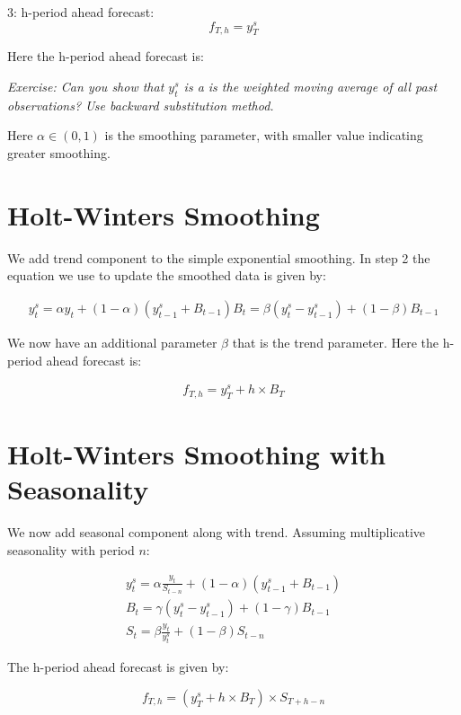 \documentclass[]{book}
\theoremstyle{definition}
\theoremstyle{definition}
\theoremstyle{definition}
\theoremstyle{remark}
\begin{document}
3: h-period ahead forecast: \[f_{T,h}= y_T^s\]

Here the h-period ahead forecast is:

\emph{Exercise: Can you show that \(y_{t}^{s}\) is a is the weighted
moving average of all past observations? Use backward substitution
method.}

Here \(\alpha \in (0,1)\) is the smoothing parameter, with smaller value
indicating greater smoothing.

\hypertarget{holt-winters-smoothing}{%
\section{Holt-Winters Smoothing}\label{holt-winters-smoothing}}

We add trend component to the simple exponential smoothing. In step 2
the equation we use to update the smoothed data is given by:

\begin{align}
    y_{t}^{s}= \alpha y_t + (1-\alpha)(y_{t-1}^{s}+B_{t-1})
    B_t = \beta (y_t^s -y_{t-1}^s) + (1-\beta) B_{t-1}
 \end{align}

We now have an additional parameter \(\beta\) that is the trend
parameter. Here the h-period ahead forecast is:

\begin{align}
  f_{T,h} = y_T^s + h\times B_T
  \end{align}

\hypertarget{holt-winters-smoothing-with-seasonality}{%
\section{Holt-Winters Smoothing with
Seasonality}\label{holt-winters-smoothing-with-seasonality}}

We now add seasonal component along with trend. Assuming multiplicative
seasonality with period \(n\):

\begin{align}
    y_{t}^{s}= \alpha \frac{y_t}{S_{t-n}} + (1-\alpha)(y_{t-1}^{s}+B_{t-1})\\
    B_t = \gamma (y_t^s -y_{t-1}^s) + (1-\gamma) B_{t-1}\\
    S_t = \beta\frac{y_t}{y_t^s}+(1-\beta)S_{t-n}
  \end{align}

The h-period ahead forecast is given by:

\begin{equation}
    f_{T,h}= (y_T^s + h\times B_T) \times S_{T+h-n}
   \end{equation}
\end{document}

